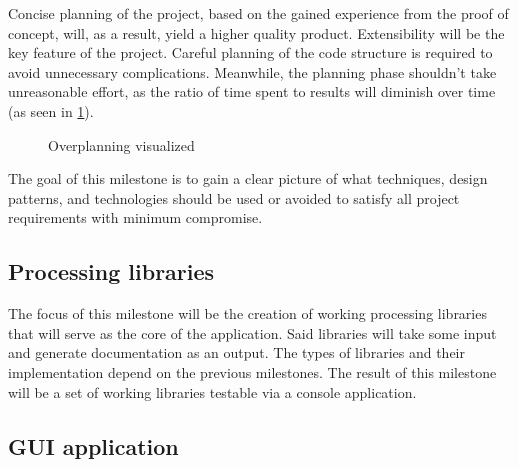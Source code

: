 Concise planning of the project, based on the gained experience from the proof of concept, will, as a result, yield a higher quality product.
Extensibility will be the key feature of the project. Careful planning of the code structure is required to avoid unnecessary complications.
Meanwhile, the planning phase shouldn't take unreasonable effort, as the ratio of time spent to results will diminish over time (as seen in \ref{fig:overplanning}). \cite{ruparelia_stop_2016}

\begin{figure}[H]
    \centering
    \label{fig:overplanning}
    \caption{Overplanning visualized}
\end{figure}

The goal of this milestone is to gain a clear picture of what techniques, design patterns, and technologies should be used or avoided to satisfy all project requirements with minimum compromise.

\subsection*{Processing libraries} \label{subSecProcessingLibs}

The focus of this milestone will be the creation of working processing libraries that will serve as the core of the application. Said libraries will take some input and generate documentation as an output. The types of libraries and their implementation depend on the previous milestones. The result of this milestone will be a set of working libraries testable via a console application.

\subsection*{GUI application} \label{subSecGuiApp}

